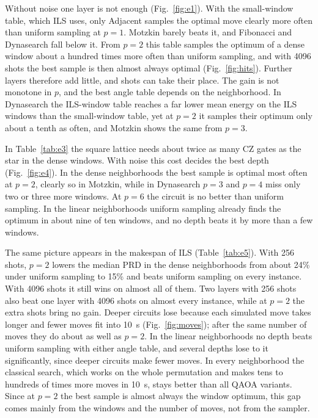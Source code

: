 \documentclass[runningheads]{llncs}
\begin{document}
Without noise one layer is not enough (Fig.~\ref{fig:e1}). With the
small-window table, which ILS uses, only Adjacent samples the optimal move
clearly more often than uniform sampling at $p = 1$. Motzkin barely beats it,
and Fibonacci and Dynasearch fall below it. From
$p = 2$ this table samples the optimum of a dense window about a hundred
times more often than uniform sampling, and with 4096 shots the best sample
is then almost always optimal (Fig.~\ref{fig:hits}). Further layers therefore
add little, and shots can take their place. The gain is not monotone in $p$,
and the best angle table depends on the neighborhood. In Dynasearch the
ILS-window table reaches a far lower mean energy on the ILS windows than the
small-window table, yet at $p = 2$ it samples their optimum only about a
tenth as often, and Motzkin shows the same from $p = 3$.

In Table~\ref{tab:e3} the square lattice needs about twice as many CZ gates
as the star in the dense windows. With noise this cost decides the best depth
(Fig.~\ref{fig:e4}). In the dense neighborhoods the best sample is optimal
most often at $p = 2$, clearly so in Motzkin, while in Dynasearch $p = 3$ and
$p = 4$ miss only two or three more windows. At $p = 6$ the circuit is no
better than uniform sampling. In the linear neighborhoods uniform sampling
already finds the optimum in about nine of ten windows, and no depth beats it
by more than a few windows.

The same picture appears in the makespan of ILS (Table~\ref{tab:e5}). With
256 shots, $p = 2$ lowers the median PRD in the dense neighborhoods from
about 24\% under uniform sampling to 15\% and beats uniform sampling on every
instance. With 4096 shots it still wins on almost all of them. Two layers
with 256 shots also beat one layer with 4096 shots on almost every instance,
while at $p = 2$ the extra shots bring no gain. Deeper circuits lose because
each simulated move takes longer and fewer moves fit into 10~s
(Fig.~\ref{fig:moves}); after the same number of moves they do about as well
as $p = 2$. In the linear neighborhoods no depth beats uniform sampling with
either angle table, and several depths lose to it significantly, since deeper
circuits make fewer moves. In every neighborhood the classical search, which works on the
whole permutation and makes tens to hundreds of times more moves in 10~s,
stays better than all QAOA variants. Since at $p = 2$ the best sample is
almost always the window optimum, this gap comes mainly from the windows and
the number of moves, not from the sampler.
\end{document}
